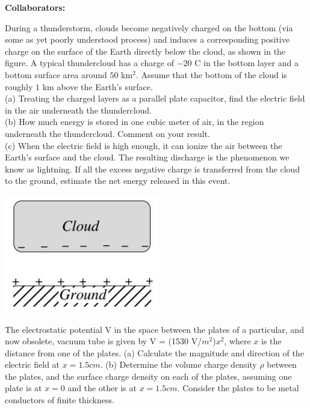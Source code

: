 \documentclass[11pt,letterpaper,boxed]{hmcpset}
\begin{document}
	
	\noindent\textbf{Collaborators:} 
	
	
	\begin{problem}
During a thunderstorm, clouds become negatively charged on the bottom (via some as yet poorly understood process) and induces a corresponding positive charge on the surface of the Earth directly below the cloud, as shown in the figure. A typical thundercloud has a charge of $-20$ C in the bottom layer and a bottom surface area around $50$ km$^2$. Assume that the bottom of the cloud is roughly 
$1$ km above the Earth’s surface.\\
(a) Treating the charged layers as a parallel plate capacitor, find the electric field in the air underneath the thundercloud.\\
(b) How much energy is stored in one cubic meter of air, in the region underneath the thundercloud. Comment on your result. \\
(c) When the electric field is high enough, it can ionize the air between the Earth’s surface and the cloud. The resulting discharge is the phenomenon we know as lightning. If all the excess negative charge is transferred from the cloud to the ground, estimate the net energy released in this event.

		\begin{center}
		\includegraphics[scale=.7]{51m6pic.jpg}
		\end{center}
		
	\end{problem}
	
	\begin{solution}
		\vfill
	\end{solution}
	\newpage
	
\begin{problem}
The electrostatic potential V in the space between the plates of a particular, and now obsolete,
vacuum tube is given by V = (1530 V/$m^2$)$x^2$, where $x$ is the distance from one of the plates.
(a) Calculate the magnitude and direction of the electric field at $x = 1.5 cm$.
(b) Determine the volume charge density $\rho$ between the plates, and the surface charge density on each of the plates, assuming one plate is at $x = 0$ and the other is at $x = 1.5 cm$. Consider the plates to be metal conductors of finite thickness.
\end{problem}
\end{document}
